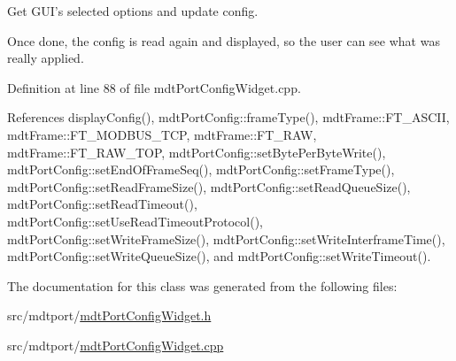 Get G\-U\-I's selected options and update config. 

Once done, the config is read again and displayed, so the user can see what was really applied. 

Definition at line 88 of file mdt\-Port\-Config\-Widget.\-cpp.



References display\-Config(), mdt\-Port\-Config\-::frame\-Type(), mdt\-Frame\-::\-F\-T\-\_\-\-A\-S\-C\-I\-I, mdt\-Frame\-::\-F\-T\-\_\-\-M\-O\-D\-B\-U\-S\-\_\-\-T\-C\-P, mdt\-Frame\-::\-F\-T\-\_\-\-R\-A\-W, mdt\-Frame\-::\-F\-T\-\_\-\-R\-A\-W\-\_\-\-T\-O\-P, mdt\-Port\-Config\-::set\-Byte\-Per\-Byte\-Write(), mdt\-Port\-Config\-::set\-End\-Of\-Frame\-Seq(), mdt\-Port\-Config\-::set\-Frame\-Type(), mdt\-Port\-Config\-::set\-Read\-Frame\-Size(), mdt\-Port\-Config\-::set\-Read\-Queue\-Size(), mdt\-Port\-Config\-::set\-Read\-Timeout(), mdt\-Port\-Config\-::set\-Use\-Read\-Timeout\-Protocol(), mdt\-Port\-Config\-::set\-Write\-Frame\-Size(), mdt\-Port\-Config\-::set\-Write\-Interframe\-Time(), mdt\-Port\-Config\-::set\-Write\-Queue\-Size(), and mdt\-Port\-Config\-::set\-Write\-Timeout().



The documentation for this class was generated from the following files\-:\begin{DoxyCompactItemize}
\item 
src/mdtport/\hyperlink{mdt_port_config_widget_8h}{mdt\-Port\-Config\-Widget.\-h}\item 
src/mdtport/\hyperlink{mdt_port_config_widget_8cpp}{mdt\-Port\-Config\-Widget.\-cpp}\end{DoxyCompactItemize}
